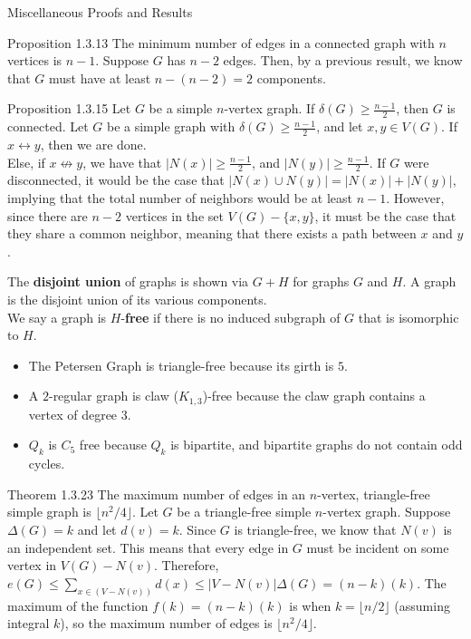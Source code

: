 \documentclass[10pt]{extarticle}
\begin{document}
\begin{problem}{Miscellaneous Proofs and Results}
  \begin{problem}{Proposition 1.3.13}
    The minimum number of edges in a connected graph with $n$ vertices is $n-1$.
    \tcblower
    Suppose $G$ has $n-2$ edges. Then, by a previous result, we know that $G$ must have at least $n-(n-2) = 2$ components.
  \end{problem}
  \begin{problem}{Proposition 1.3.15}
    Let $G$ be a simple $n$-vertex graph. If $\delta(G) \geq \frac{n-1}{2}$, then $G$ is connected.
    \tcblower
    Let $G$ be a simple graph with $\delta(G) \geq \frac{n-1}{2}$, and let $x,y\in V(G)$. If $x\leftrightarrow y$, then we are done.\\

    Else, if $x\not\leftrightarrow y$, we have that $|N(x)| \geq \frac{n-1}{2}$, and $|N(y)| \geq \frac{n-1}{2}$. If $G$ were disconnected, it would be the case that $|N(x)\cup N(y)| = |N(x)| + |N(y)|$, implying that the total number of neighbors would be at least $n-1$. However, since there are $n-2$ vertices in the set $V(G) - \{x,y\}$, it must be the case that they share a common neighbor, meaning that there exists a path between $x$ and $y$.
  \end{problem}
  The \textbf{disjoint union} of graphs is shown via $G+H$ for graphs $G$ and $H$. A graph is the disjoint union of its various components.\\

  We say a graph is $H$-\textbf{free} if there is no induced subgraph of $G$ that is isomorphic to $H$.
  \begin{itemize}
    \item The Petersen Graph is triangle-free because its girth is $5$.
    \item A $2$-regular graph is claw ($K_{1,3}$)-free because the claw graph contains a vertex of degree $3$.
    \item $Q_k$ is $C_5$ free because $Q_k$ is bipartite, and bipartite graphs do not contain odd cycles.
  \end{itemize}
  \begin{problem}{Theorem 1.3.23}
    The maximum number of edges in an $n$-vertex, triangle-free simple graph is $\lfloor n^2/4\rfloor$.
    \tcblower
    Let $G$ be a triangle-free simple $n$-vertex graph. Suppose $\Delta(G) = k$ and let $d(v) = k$. Since $G$ is triangle-free, we know that $N(v)$ is an independent set. This means that every edge in $G$ must be incident on some vertex in $V(G) - N(v)$. Therefore, $e(G) \leq \sum_{x\in (V - N(v))} d(x) \leq |V - N(v)|\Delta(G) = (n-k)(k)$. The maximum of the function $f(k) = (n-k)(k)$ is when $k = \lfloor n/2 \rfloor$ (assuming integral $k$), so the maximum number of edges is $\lfloor n^2/4\rfloor$.
  \end{problem}
\end{problem}
\end{document}
